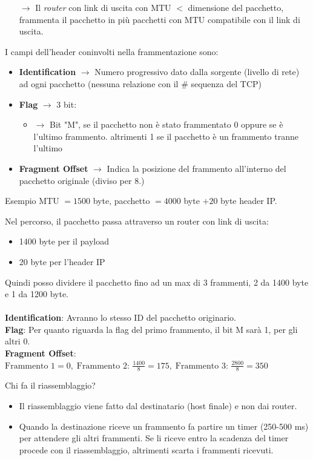 \documentclass[a4paper]{article}
\begin{document}
\begin{itemize}
  \item[$\rightarrow$] Il \textit{router} con link di uscita con MTU $<$ dimensione del pacchetto, frammenta il pacchetto in più pacchetti con MTU
  compatibile con il link di uscita.
\end{itemize}
I campi dell'header coninvolti nella frammentazione sono:
\begin{itemize}
  \item \textbf{Identification} $\rightarrow$ Numero progressivo dato dalla sorgente (livello di rete) ad ogni pacchetto (nessuna relazione con il \# sequenza del TCP)
  \item \textbf{Flag} $\rightarrow$ 3 bit: \begin{itemize}
    \item $\rightarrow$ Bit "M", se il pacchetto non è stato frammentato 0 oppure se è l'ultimo frammento.
    altrimenti 1 se il pacchetto è un frammento tranne l'ultimo
  \end{itemize}
  \item \textbf{Fragment Offset} $\rightarrow$ Indica la posizione del frammento all'interno del pacchetto originale (diviso per 8.)

\end{itemize}
\begin{examplebox}{Esempio}
  MTU $= 1500$ byte, pacchetto $= 4000$ byte $+ 20$ byte header IP.

  Nel percorso, il pacchetto passa attraverso un router con link di uscita:
  \begin{itemize}
    \item 1400 byte per il payload
    \item 20 byte per l'header IP
  \end{itemize}

  Quindi posso dividere il pacchetto fino ad un max di 3 frammenti, 2 da 1400 byte e 1 da 1200 byte.\\\\
  \textbf{Identification}: Avranno lo stesso ID del pacchetto originario.\\
  \textbf{Flag}: Per quanto riguarda la flag del primo frammento, il bit M sarà 1, per gli altri 0.\\
  \textbf{Fragment Offset}: $\text{Frammento 1} = 0, \; \text{Frammento 2: } \frac{1400}{8} = 175, \; \text{Frammento 3: } \frac{2800}{8} = 350$
  \end{examplebox}

  Chi fa il riassemblaggio?
  \begin{itemize}
    \item Il riassemblaggio viene fatto dal destinatario (host finale) e non dai router. 
    \item Quando la destinazione riceve un frammento fa partire un timer (250-500 ms) per attendere gli altri frammenti. Se li riceve entro 
    la scadenza del timer procede con il riassemblaggio, altrimenti scarta i frammenti ricevuti.
  \end{itemize}
\end{document}
